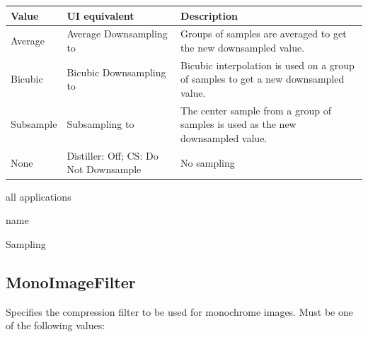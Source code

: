 \documentclass[letterpaper,12pt,english,openany,oneside]{sphinxmanual}
\begin{document}
\begin{savenotes}\sphinxattablestart
\centering
{}\label{\detokenize{PDF_Create_CommonSettings:section-11}}\nobreak
\begin{tabulary}{\linewidth}[t]{|T|T|T|}
\hline
\sphinxstyletheadfamily 
Value
&\sphinxstyletheadfamily 
UI equivalent
&\sphinxstyletheadfamily 
Description
\\
\hline
Average
&
Average Downsampling to
&
Groups of samples are averaged to get the new downsampled value.
\\
\hline
Bicubic
&
Bicubic Downsampling to
&
Bicubic interpolation is used on a group of samples to get a new downsampled value.
\\
\hline
Subsample
&
Subsampling to
&
The center sample from a group of samples is used as the new downsampled value.
\\
\hline
None
&
Distiller: Off; CS: Do Not Downsample
&
No sampling
\\
\hline
\end{tabulary}
\par
\sphinxattableend\end{savenotes}
\label{\detokenize{PDF_Create_CommonSettings:supported-by-61}}

all applications

\label{\detokenize{PDF_Create_CommonSettings:type-61}}

name

\label{\detokenize{PDF_Create_CommonSettings:ui-name-47}}

Sampling

\label{\detokenize{PDF_Create_CommonSettings:default-value-57}}

\begin{sphinxVerbatim}[commandchars=\\\{\}]
\end{sphinxVerbatim}




\subsection{MonoImageFilter}
\label{\detokenize{PDF_Create_CommonSettings:monoimagefilter}}
Specifies the compression filter to be used for monochrome images. Must be one of the following values:
\end{document}
